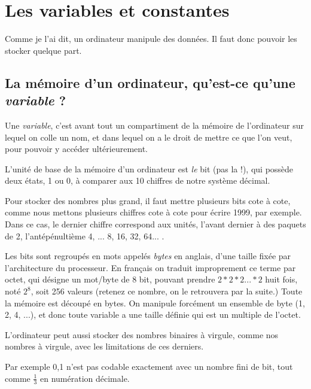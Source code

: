 \chapter{Les variables et constantes}
Comme je l'ai dit, un ordinateur manipule des données.
Il faut donc pouvoir les stocker quelque part.
\section{La mémoire d'un ordinateur, qu'est-ce qu'une \emph{variable} ?}
Une \emph{variable},
c'est avant tout un compartiment de la mémoire de l'ordinateur 
sur lequel on colle un nom,
et dans lequel on a le droit de mettre ce que l'on veut,
pour pouvoir y accéder ultérieurement.

L'unité de base de la mémoire d'un ordinateur est \emph{le} bit (pas la !),
qui possède deux états, 1 ou 0,
à comparer aux 10 chiffres de notre système décimal.

Pour stocker des nombres
plus grand, il faut mettre plusieurs bits cote à cote,
comme nous mettons plusieurs chiffres cote à cote pour écrire 1999, par exemple.
Dans ce cas, le dernier chiffre correspond aux unités, l'avant dernier à
des paquets de 2, l'antépénultième 4, ... 8, 16, 32, 64... .

Les bits sont regroupés en mots appelés \emph{bytes} en anglais,
d'une taille fixée par l'architecture du processeur.
En français on traduit improprement ce terme par octet,
qui désigne un mot/byte de 8 bit, pouvant prendre
\begin{math}2*2*2...*2\end{math} huit fois, noté \begin{math} 2^{8} \end{math},
soit 256 valeurs (retenez ce nombre, on le retrouvera par la suite.)
Toute la mémoire est découpé en bytes.
On manipule forcément un ensemble de byte (1, 2, 4, ...),
et donc toute variable a une taille définie qui est un multiple de l'octet.

L'ordinateur peut aussi stocker des nombres binaires à virgule,
comme nos nombres à virgule, avec les limitations de ces derniers.

Par exemple
0,1 n'est pas codable exactement avec un nombre fini de bit,
tout comme \(\frac{1}{3}\) en numération décimale.



